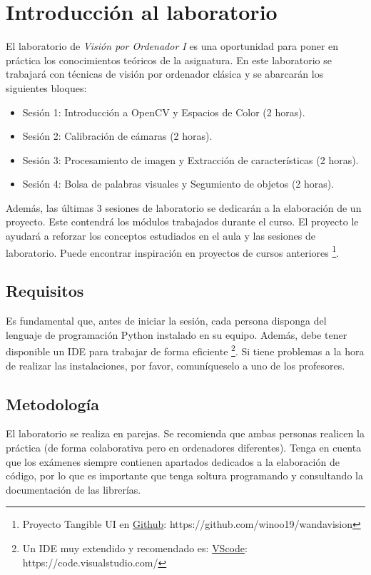 \chapter{Introducción al laboratorio}
\label{chapter:introduction_lab}

El laboratorio de \textit{Visión por Ordenador I} es una oportunidad para poner en práctica los conocimientos teóricos de la asignatura. En este laboratorio se trabajará con técnicas de visión por ordenador clásica y se abarcarán los siguientes bloques: 

\begin{itemize}
    \item Sesión 1: Introducción a OpenCV y Espacios de Color (2 horas).
    \item Sesión 2: Calibración de cámaras (2 horas).
    \item Sesión 3: Procesamiento de imagen y Extracción de características  (2 horas).
    \item Sesión 4: Bolsa de palabras visuales y Segumiento de objetos (2 horas).
\end{itemize}

Además, las últimas 3 sesiones de laboratorio se dedicarán a la elaboración de un proyecto. Este contendrá los módulos trabajados durante el curso. El proyecto le ayudará a reforzar los conceptos estudiados en el aula y las sesiones de laboratorio. Puede encontrar inspiración en proyectos de cursos anteriores \footnote{Proyecto Tangible UI en \href{https://github.com/winoo19/wandavision}{Github}: https://github.com/winoo19/wandavision}.


\section{Requisitos}
Es fundamental que, antes de iniciar la sesión, cada persona disponga del lenguaje de programación Python instalado en su equipo. Además, debe tener disponible un IDE para trabajar de forma eficiente \footnote{Un IDE muy extendido y recomendado es: \href{https://code.visualstudio.com/}{VScode}: https://code.visualstudio.com/}. Si tiene problemas a la hora de realizar las instalaciones, por favor, comuníqueselo a uno de los profesores.

\section{Metodología}
El laboratorio se realiza en parejas. Se recomienda que ambas personas realicen la práctica (de forma colaborativa pero en ordenadores diferentes). Tenga en cuenta que los exámenes siempre contienen apartados dedicados a la elaboración de código, por lo que es importante que tenga soltura programando y consultando la documentación de las librerías. 

